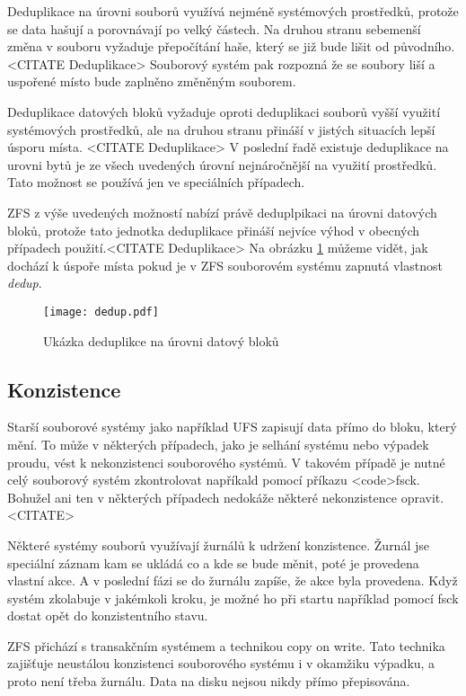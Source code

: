 Deduplikace na úrovni souborů využívá nejméně systémových prostředků, protože se data hašují a porovnávají po velký částech. Na druhou stranu sebemenší změna v souboru vyžaduje přepočítání haše, který se již bude lišit od původního.<CITATE Deduplikace> Souborový systém pak rozpozná že se soubory liší a uspořené místo bude zaplněno změněným souborem.

Deduplikace datových bloků vyžaduje oproti deduplikaci souborů vyšší využití systémových prostředků, ale na druhou stranu přináší v jistých situacích lepší úsporu místa. <CITATE Deduplikace>
V poslední řadě existuje deduplikace na urovni bytů je ze všech uvedených úrovní nejnáročnější na využití prostředků. Tato možnost se používá jen ve speciálních případech.

ZFS z výše uvedených možností nabízí právě deduplpikaci na úrovni datových bloků, protože tato jednotka deduplikace přináší nejvíce výhod v obecných případech použití.<CITATE Deduplikace> Na obrázku \ref{blockdedup} můžeme vidět, jak dochází k úspoře místa pokud je v ZFS souborovém systému zapnutá vlastnost \emph{dedup}.
\begin{figure}[!h]
    \caption{Ukázka deduplikce na úrovni datový bloků}
    \label{blockdedup}
    \texttt{[image: dedup.pdf]}
\end{figure}
\subsection{Konzistence}
\label{consitence}
Starší souborové systémy jako například UFS zapisují data přímo do bloku, který mění. To může v některých případech, jako je selhání systému nebo výpadek proudu, vést k nekonzistenci souborového systémů. V takovém případě je nutné celý souborový systém zkontrolovat napříkald pomocí příkazu <code>fsck. Bohužel ani ten v některých případech
nedokáže některé nekonzistence opravit. <CITATE>

Některé systémy souborů využívají žurnálů k udržení konzistence. Žurnál jse speciální záznam kam se ukládá co a kde se bude měnit, poté
je provedena vlastní akce. A v poslední fázi se do žurnálu zapíše, že akce byla provedena. Když systém zkolabuje v jakémkoli kroku, je možné ho při startu například pomocí
fsck dostat opět do konzistentního stavu.

ZFS přichází s transakčním systémem a technikou copy on write. Tato technika zajišťuje neustálou konzistenci souborového systému i v okamžiku výpadku, a proto není třeba žurnálu. Data na disku nejsou nikdy přímo přepisována.

